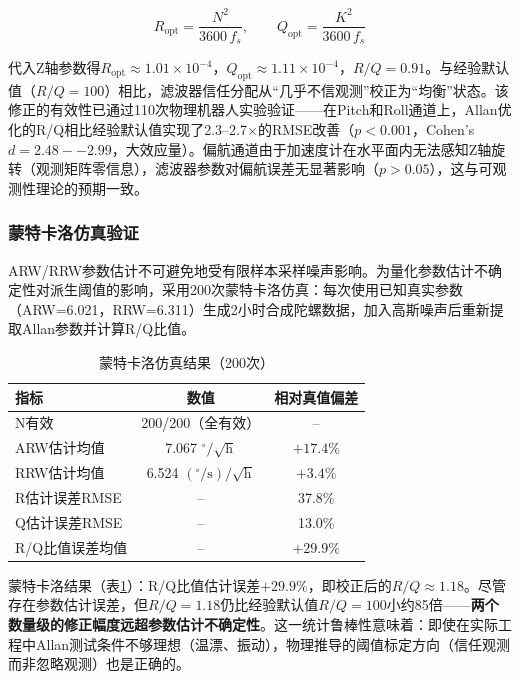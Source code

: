 \documentclass{rjthesis}
\begin{document}
\begin{equation}
    R_{\text{opt}}=\frac{N^2}{3600\,f_s},\qquad Q_{\text{opt}}=\frac{K^2}{3600\,f_s}
    \label{eq:rq_map}
\end{equation}

代入Z轴参数得$R_{\text{opt}}\approx1.01\!\times\!10^{-4}$，$Q_{\text{opt}}\approx1.11\!\times\!10^{-4}$，$R/Q=0.91$。与经验默认值（$R/Q=100$）相比，滤波器信任分配从``几乎不信观测''校正为``均衡''状态。该修正的有效性已通过110次物理机器人实验验证——在Pitch和Roll通道上，Allan优化的R/Q相比经验默认值实现了2.3--2.7$\times$的RMSE改善（$p<0.001$，Cohen's $d=2.48--2.99$，大效应量）。偏航通道由于加速度计在水平面内无法感知Z轴旋转（观测矩阵零信息），滤波器参数对偏航误差无显著影响（$p>0.05$），这与可观测性理论的预期一致。

\subsubsection{蒙特卡洛仿真验证}

ARW/RRW参数估计不可避免地受有限样本采样噪声影响。为量化参数估计不确定性对派生阈值的影响，采用200次蒙特卡洛仿真：每次使用已知真实参数（ARW=6.021，RRW=6.311）生成2小时合成陀螺数据，加入高斯噪声后重新提取Allan参数并计算R/Q比值。

\begin{table}[h]
    \centering
    \caption{蒙特卡洛仿真结果（200次）}
    \label{tab:mc}
    \small
    \begin{tabular}{l c c}
        \toprule
        指标 & 数值 & 相对真值偏差 \\
        \midrule
        N有效 & 200/200（全有效） & -- \\
        ARW估计均值 & 7.067 $^\circ/\sqrt{\mathrm{h}}$ & $+17.4\%$ \\
        RRW估计均值 & 6.524 $(\!^\circ/\mathrm{s})/\sqrt{\mathrm{h}}$ & $+3.4\%$ \\
        R估计误差RMSE & -- & 37.8\% \\
        Q估计误差RMSE & -- & 13.0\% \\
        R/Q比值误差均值 & -- & \textbf{$+29.9\%$} \\
        \bottomrule
    \end{tabular}
\end{table}

蒙特卡洛结果（表\ref{tab:mc}）：R/Q比值估计误差$+29.9\%$，即校正后的$R/Q\approx1.18$。尽管存在参数估计误差，但$R/Q=1.18$仍比经验默认值$R/Q=100$小约85倍——\textbf{两个数量级的修正幅度远超参数估计不确定性}。这一统计鲁棒性意味着：即使在实际工程中Allan测试条件不够理想（温漂、振动），物理推导的阈值标定方向（信任观测而非忽略观测）也是正确的。
\end{document}
